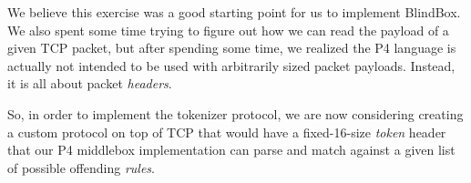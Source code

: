 \documentclass{winslabreport}
\begin{document}
We believe this exercise was a good starting point for us to implement BlindBox. We also spent some time trying to figure out how we can read the payload of a given TCP packet, but after spending some time, we realized the P4 language is actually not intended to be used with arbitrarily sized packet payloads. Instead, it is all about packet \emph{headers}. 

So, in order to implement the tokenizer protocol, we are now considering creating a custom protocol on top of TCP that would have a fixed-16-size \emph{token} header that our P4 middlebox implementation can parse and match against a given list of possible offending \emph{rules}.



\end{document}
